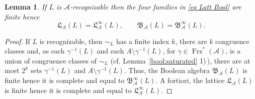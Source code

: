 \documentclass[11pt,a4paper]{article}
\newtheorem{lemma}[theorem]{Lemma}
\theoremstyle{definition} %
\newtheorem{remark}[theorem]{Remark}
\newcommand\+[1]{\mathcal{#1}} %
\newcommand{\Bool}{{\mathfrak{B}}}   %
\newcommand{\Latt}{{\mathfrak{L}}}
\DeclareMathOperator{\freez}{Frz}%
\newcommand{\DUO}{{\freez}^*}
\newcommand{\pat}{\color{red}}
\begin{document}
\begin{lemma}\label{l;recFinite}
If $L$ is $\+A$-recognizable
then the four families in \eqref{eq Latt Bool} are finite 
hence
\begin{equation*}\label{eq Latt Bool when L rec}
\Latt_\+A(L) = \Latt_\+A^\infty(L),
\qquad
\Bool_\+A(L)  = \Bool_\+A^\infty(L).
\end{equation*}
\end{lemma}
%
\begin{proof}
If $L$ is recognizable, then $\sim_L$ has a finite  index $k$, there are $k$ congruence classes 
and, as each $\gamma^{-1} (L)$  and each $A\setminus \gamma^{-1} (L)$, 
for $\gamma\in \DUO(\+A)$, 
is a union of congruence classes of  $\sim_L$  (cf.\! Lemma~\ref{bool:saturated} 1)\,),  
there are at most $2^{k}$  sets $\gamma^{-1} (L)$ 
and $A\setminus \gamma^{-1} (L)$.
Thus, the Boolean algebra $\Bool_{\+A}(L)$ is finite 
hence it is complete and equal to $\Bool_{\+A}^\infty(L)$.
A fortiori, the lattice $\Latt_{\+A}(L)$ is finite 
hence it is complete and equal to $\Latt_{\+A}^\infty(L)$.
\end{proof}
\fi
%

\end{document}
